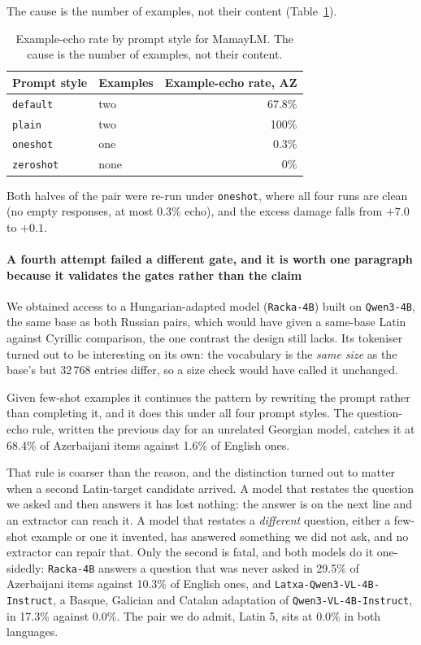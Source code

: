 \documentclass[final]{clv2025}
\begin{document}
The cause is the number of examples, not their content
(Table~\ref{tab:echo-style}).

\begin{table}[h!]
\caption{Example-echo rate by prompt style for MamayLM. The cause is the number
of examples, not their content.}
\label{tab:echo-style}
\centering
\begin{tabular}{llr}
\toprule
Prompt style & Examples & Example-echo rate, AZ \\
\midrule
\texttt{default} & two & 67.8\% \\
\texttt{plain} & two & 100\% \\
\texttt{oneshot} & one & 0.3\% \\
\texttt{zeroshot} & none & 0\% \\
\bottomrule
\end{tabular}
\end{table}

Both halves of the pair were re-run under \texttt{oneshot}, where all four runs
are clean (no empty responses, at most 0.3\% echo), and the excess damage falls
from $+7.0$ to $+0.1$.

\paragraph{A fourth attempt failed a different gate, and it is worth one
paragraph because it validates the gates rather than the claim} We obtained
access to a Hungarian-adapted model (\texttt{Racka-4B}) built on
\texttt{Qwen3-4B}, the same base as both Russian pairs, which would have given
a same-base Latin against Cyrillic comparison, the one contrast the design
still lacks. Its tokeniser turned out to be interesting on its own: the
vocabulary is the \emph{same size} as the base's but 32\,768 entries differ, so
a size check would have called it unchanged.

Given few-shot examples it continues the pattern by rewriting the prompt rather
than completing it, and it does this under all four prompt styles. The
question-echo rule, written the previous day for an unrelated Georgian model,
catches it at 68.4\% of Azerbaijani items against 1.6\% of English ones.

That rule is coarser than the reason, and the distinction turned out to matter
when a second Latin-target candidate arrived. A model that restates the
question we asked and then answers it has lost nothing: the answer is on the
next line and an extractor can reach it. A model that restates a
\emph{different} question, either a few-shot example or one it invented, has
answered something we did not ask, and no extractor can repair that. Only the
second is fatal, and both models do it one-sidedly: \texttt{Racka-4B} answers a
question that was never asked in 29.5\% of Azerbaijani items against 10.3\% of
English ones, and \texttt{Latxa-Qwen3-VL-4B-Instruct}, a Basque, Galician and
Catalan adaptation of \texttt{Qwen3-VL-4B-Instruct}, in 17.3\% against 0.0\%.
The pair we do admit, Latin 5, sits at 0.0\% in both languages.
\end{document}
